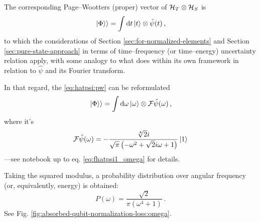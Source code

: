 The corresponding Page--Wootters (proper) vector of $\mathcal{H}_T \otimes \mathcal{H}_S$ is
\begin{equation}\label{eq:hatpsi:pw}
  \left.\left| \Phi \right\rangle\right\rangle = \int \dd{t} \ket{t} \otimes \hat{\psi}(t) \,\text{,}
\end{equation}
to which the considerations of Section \ref{sec:for-normalized-elements}
and Section \ref{sec:pure-state-approach} in terms of time--frequency
(or time--energy) uncertainty relation apply, with some analogy
to what \cite{RuschhauptAbsorption} does within its own framework
in relation to $\hat{\psi}$ and its Fourier transform.

In that regard, the \eqref{eq:hatpsi:pw} can be reformulated
\begin{equation}
  \left.\left| \Phi \right\rangle\right\rangle = \int \dd{\omega} \ket{\omega} \otimes \mathcal{F} \hat{\psi} (\omega) \,\text{,}
\end{equation}
where it's
\begin{equation}
  \mathcal{F} \hat{\psi} (\omega) = - \frac{\sqrt[4]{2} i}{\sqrt{\pi} \left(- \omega^{2} + \sqrt{2} i \omega + 1\right)} \ket{1}
\end{equation}
---see notebook up to eq. \eqref{eq:fhatpsi1_omega} for details.

Taking the squared modulus, a probability distribution over angular frequency
(or, equivalently, energy) is obtained:
\[
  P(\omega) = \frac{\sqrt{2}}{\pi \left(\omega^{4} + 1\right)}
  \,\text{.}
\]
See Fig. \ref{fig:absorbed-qubit-normalization-loss:omega}.